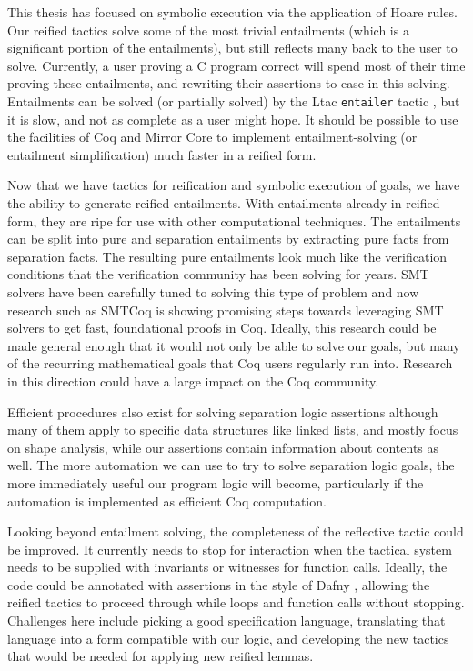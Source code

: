 \documentclass{puthesis}
\begin{document}
This thesis has focused on symbolic execution via the application of
Hoare rules.  Our reified tactics solve some of the most trivial
entailments (which is a significant portion of the entailments), but
still reflects many back to the user to solve. Currently, a user
proving a C program correct will spend most of their time proving
these entailments, and rewriting their assertions to ease in this
solving. Entailments can be solved (or partially solved) by the Ltac
\lstinline|entailer| tactic \cite[Chapter 26]{plcc}, but it is slow,
and not as complete as a user might hope.  It should be possible to
use the facilities of Coq and Mirror Core to implement
entailment-solving (or entailment simplification) much faster in a
reified form.

Now that we have tactics for reification and symbolic execution of
goals, we have the ability to generate reified entailments.  With
entailments already in reified form, they are ripe for use with other
computational techniques. The entailments can be split into pure and
separation entailments by extracting pure facts from separation
facts. The resulting pure entailments look much like the verification
conditions that the verification community has been solving for
years. SMT solvers have been carefully tuned to solving this type of
problem and now research such as SMTCoq \cite{smtcoq} is showing
promising steps towards leveraging SMT solvers to get fast,
foundational proofs in Coq. Ideally, this research could be made
general enough that it would not only be able to solve our goals, but
many of the recurring mathematical goals that Coq users regularly run
into. Research in this direction could have a large impact on the Coq
community.

Efficient procedures also exist for solving separation logic
assertions \cite{DBLP:conf/vmcai/NguyenDQC07,
  Brotherston-Distefano-Petersen:11, navarro11, cook11} although many
of them apply to specific data structures like linked lists, and
mostly focus on shape analysis, while our assertions contain
information about contents as well. The more automation we can use to
try to solve separation logic goals, the more immediately useful our
program logic will become, particularly if the automation is
implemented as efficient Coq computation.

Looking beyond entailment solving, the completeness of the reflective
tactic could be improved. It currently needs to stop for interaction
when the tactical system needs to be supplied with invariants or
witnesses for function calls. Ideally, the code could be annotated
with assertions in the style of Dafny \cite{leino2010dafny}, allowing
the reified tactics to proceed through while loops and function calls
without stopping. Challenges here include picking a good specification
language, translating that language into a form compatible with our
logic, and developing the new tactics that would be needed for
applying new reified lemmas. 
\end{document}
